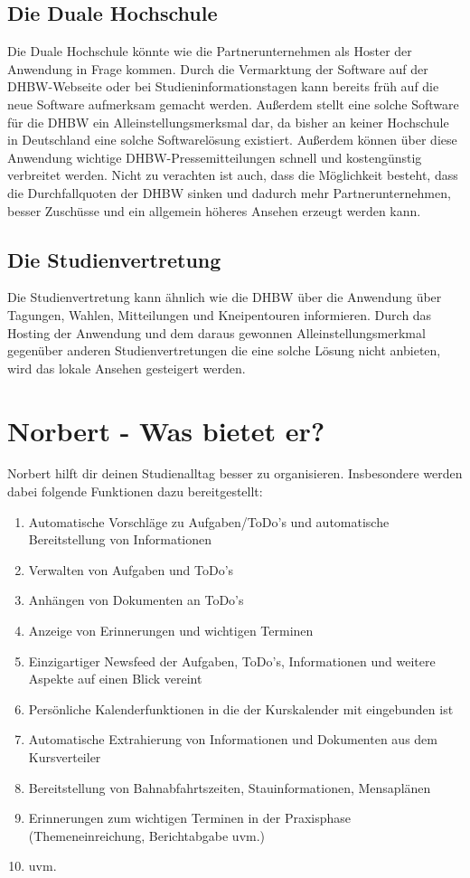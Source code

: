 \subsection{Die Duale Hochschule}
Die Duale Hochschule könnte wie die Partnerunternehmen als Hoster der Anwendung in Frage kommen. Durch die Vermarktung der Software auf der DHBW-Webseite oder bei Studieninformationstagen kann bereits früh auf die neue Software aufmerksam gemacht werden. Außerdem stellt eine solche Software für die DHBW ein Alleinstellungsmerksmal dar, da bisher an keiner Hochschule in Deutschland eine solche Softwarelösung existiert. Außerdem können über diese Anwendung wichtige DHBW-Pressemitteilungen schnell und kostengünstig verbreitet werden. Nicht zu verachten ist auch, dass die Möglichkeit besteht, dass die Durchfallquoten der DHBW sinken und dadurch mehr Partnerunternehmen, besser Zuschüsse und ein allgemein höheres Ansehen erzeugt werden kann.

\subsection{Die Studienvertretung} 
Die Studienvertretung kann ähnlich wie die DHBW über die Anwendung über Tagungen, Wahlen, Mitteilungen und Kneipentouren informieren. Durch das Hosting der Anwendung und dem daraus gewonnen Alleinstellungsmerkmal gegenüber anderen Studienvertretungen die eine solche Lösung nicht anbieten, wird das lokale Ansehen gesteigert werden. 

\section{Norbert - Was bietet er?}
Norbert hilft dir deinen Studienalltag besser zu organisieren. Insbesondere werden dabei folgende Funktionen dazu bereitgestellt:
\begin{enumerate}
	\item Automatische Vorschläge zu Aufgaben/ToDo's und automatische Bereitstellung von Informationen
	\item Verwalten von Aufgaben und ToDo's
	\item Anhängen von Dokumenten an ToDo's
	\item Anzeige von Erinnerungen und wichtigen Terminen
	\item Einzigartiger Newsfeed der Aufgaben, ToDo's, Informationen und weitere Aspekte auf einen Blick vereint
	\item Persönliche Kalenderfunktionen in die der Kurskalender mit eingebunden ist
	\item Automatische Extrahierung von Informationen und Dokumenten aus dem Kursverteiler
	\item Bereitstellung von Bahnabfahrtszeiten, Stauinformationen, Mensaplänen
	\item Erinnerungen zum wichtigen Terminen in der Praxisphase (Themeneinreichung, Berichtabgabe uvm.)
	\item uvm.
\end{enumerate}

